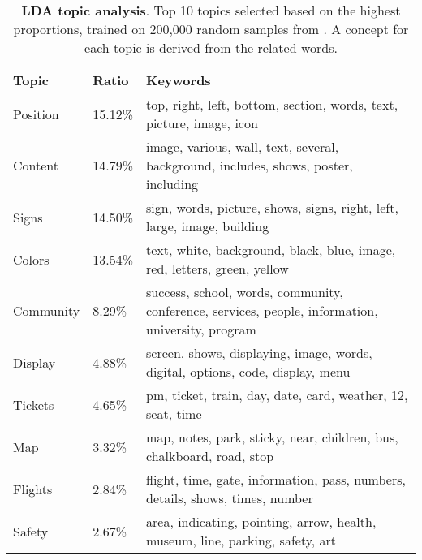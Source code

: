 \begin{table*}[t]
\centering
\small
\caption{
\textbf{LDA topic analysis}.
Top 10 topics selected based on the highest proportions, trained on 200,000 random samples from \DatasetName. 
A concept for each topic is derived from the related words.
}
\begin{tabular}{l|l|p{13cm}}
\hline
\textbf{Topic} & \textbf{Ratio} & \textbf{Keywords} \\ \hline
Position & 15.12\% & top, right, left, bottom, section, words, text, picture, image, icon \\ \hline
Content & 14.79\% & image, various, wall, text, several, background, includes, shows, poster, including \\ \hline
Signs & 14.50\% & sign, words, picture, shows, signs, right, left, large, image, building \\ \hline
Colors & 13.54\% & text, white, background, black, blue, image, red, letters, green, yellow \\ \hline
Community & 8.29\% & success, school, words, community, conference, services, people, information, university, program \\ \hline
Display & 4.88\% & screen, shows, displaying, image, words, digital, options, code, display, menu \\ 
\hline
Tickets & 4.65\% & pm, ticket, train, day, date, card, weather, 12, seat, time \\ \hline
Map & 3.32\% & map, notes, park, sticky, near, children, bus, chalkboard, road, stop \\ 
Flights & 2.84\% & flight, time, gate, information, pass, numbers, details, shows, times, number \\ \hline
Safety & 2.67\% & area, indicating, pointing, arrow, health, museum, line, parking, safety, art \\ \hline
\end{tabular}
\label{tab:lda_topics}
\end{table*}

